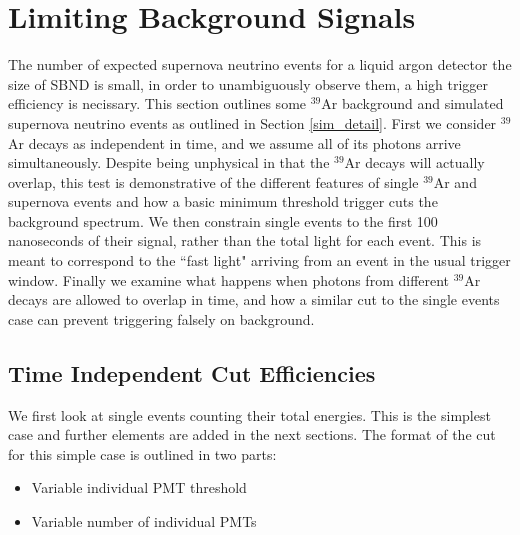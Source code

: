 \documentclass[a4paper]{article}
\begin{document}

\section{Limiting Background Signals} 

The number of expected supernova neutrino events for a liquid argon detector the size of SBND is small, in order to unambiguously observe them, a high trigger efficiency is necissary. This section outlines some $^{39}$Ar background and simulated supernova neutrino events as outlined in Section \ref{sim_detail}. First we consider $^{39}$Ar decays as independent in time, and we assume all of its photons arrive simultaneously. Despite being unphysical in that the $^{39}$Ar decays will actually overlap, this test is demonstrative of the different features of single $^{39}$Ar and supernova events and how a basic minimum threshold trigger cuts the background spectrum. We then constrain single events to the first 100 nanoseconds of their signal, rather than the total light for each event. This is meant to correspond to the ``fast light" arriving from an event in the usual trigger window. Finally we examine what happens when photons from different $^{39}$Ar decays are allowed to overlap in time, and how a similar cut to the single events case can prevent triggering falsely on background.

\subsection{Time Independent Cut Efficiencies}\label{limiting_bkg}

We first look at single events counting their total energies. This is the simplest case and further elements are added in the next sections. The format of the cut for this simple case is outlined in two parts:

\begin{itemize}
	\item Variable individual PMT threshold
	\item Variable number of individual PMTs
\end{itemize}
\end{document}
